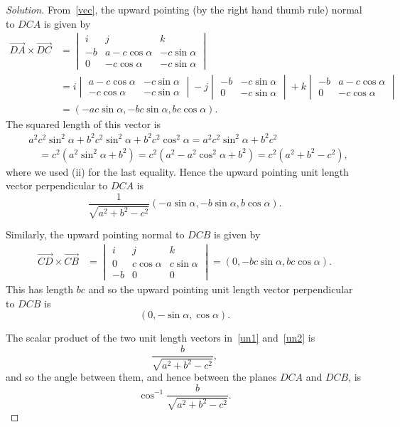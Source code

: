 \documentclass[11pt,a4paper]{report}
\theoremstyle{plain}
\theoremstyle{definition}
\begin{document}
\begin{proof}[Solution]
From~\eqref{vec}, the upward pointing (by the right hand thumb rule) normal to $ DC A    $ is given by 
\begin{align*} 
\overrightarrow{DA} \times \overrightarrow{DC} &= 
	\begin{vmatrix} i & j & k \\ -b & a- c \cos \alpha & -c \sin \alpha  \\ 0 & - c \cos \alpha & - c \sin \alpha \end{vmatrix}\\
	&= i \begin{vmatrix}   a- c \cos \alpha & -c \sin \alpha  \\  - c \cos \alpha & - c \sin \alpha \end{vmatrix}
	  - j \begin{vmatrix}   -b & -c \sin \alpha  \\  0 & - c \sin \alpha \end{vmatrix}
	  + k \begin{vmatrix}   -b & a -c \cos \alpha  \\  0 & - c \cos \alpha \end{vmatrix} \\
	  &= (-ac \sin \alpha , -bc \sin \alpha , bc \cos \alpha ).
\end{align*} 
The squared length of this vector is 
\begin{align*} 
&a^2c^2\sin^2 \alpha + b^2 c^2 \sin^2 \alpha + b^2 c^2 \cos^2 \alpha  = a^2c^2\sin^2 \alpha + b^2 c^2 \\
	&\quad = c^2(a^2 \sin^2 \alpha + b^2 ) = c^2(a^2 - a^2 \cos ^2 \alpha + b^2) = c^2 (a^2 +b^2 - c^2 ),  
\end{align*}
where we used (ii) for the last equality.  Hence the upward pointing unit length vector perpendicular  to $ DC A $    is 
\begin{equation} \label{un1} 
\frac{1}{  \sqrt{a^2 +b^2 -c^2} } (-a  \sin \alpha , -b  \sin \alpha , b  \cos \alpha ).
\end{equation} 

Similarly, the upward pointing normal to $ DC B    $ is given by 
\begin{align*} 
\overrightarrow{CD} \times \overrightarrow{CB} &= 
	\begin{vmatrix} i & j & k \\ 0 &  c \cos \alpha &c \sin \alpha  \\ -b & 0 &0 \end{vmatrix}
	  = (0 , -bc \sin \alpha , bc \cos \alpha ).
\end{align*} 
This has length $ bc $ and so the upward pointing unit length vector perpendicular  to $ DC B $    is 
\begin{equation} \label{un2}
(0 , -  \sin \alpha ,   \cos \alpha ).
\end{equation} 

The scalar product of the two unit length vectors in~\eqref{un1} and~\eqref{un2} is
\[
\frac{b}{ \sqrt{a^2 +b^2 -c^2} },
\]
and so the angle between them, and hence between the planes $ DCA $  and $ DCB $, is 
\[
\cos^{-1} \frac{b}{ \sqrt{a^2 +b^2 -c^2} }.
\]

\end{proof}
\end{document}
